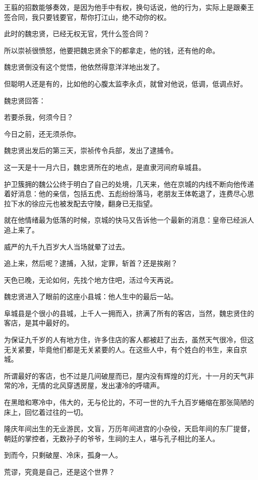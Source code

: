 \begin{multicols}{\theparacolNo}
		王翦的招数能够奏效，是因为他手中有权，换句话说，他的行为，实际上是跟秦王签合同，我只要钱要官，帮你打江山，绝不动你的权。

		此时的魏忠贤，已经无权无官，凭什么签合同？

		所以崇祯很愤怒，他要把魏忠贤余下的都拿走，他的钱，还有他的命。

		魏忠贤倒没有这个觉悟，他依然得意洋洋地出发了。

		但聪明人还是有的，比如他的心腹太监李永贞，就曾对他说，低调，低调点好。

		魏忠贤回答：

		若要杀我，何须今日？

		今日之前，还无须杀你。

		魏忠贤出发后的第三天，崇祯传令兵部，发出了逮捕令。

		这一天是十一月六日，魏忠贤所在的地点，是直隶河间府阜城县。

		护卫簇拥的魏公公终于明白了自己的处境，几天来，他在京城的内线不断向他传递着好消息：他的亲信，包括五虎、五彪纷纷落马，老朋友王体乾退了，连费尽心思拉下水的徐应元也被发配去守陵，翻身已无指望。

		就在他情绪最为低落的时候，京城的快马又告诉他一个最新的消息：皇帝已经派人追上来了。

		威严的九千九百岁大人当场就晕了过去。

		追上来，然后呢？逮捕，入狱，定罪，斩首？还是挨剐？

		天色已晚，无论如何，先找个地方住吧，活过今天再说。

		魏忠贤进入了眼前的这座小县城：他人生中的最后一站。

		阜城县是个很小的县城，上千人一拥而入，挤满了所有的客店，当然，魏忠贤住的客店，是其中最好的。

		为保证九千岁的人有地方住，许多住店的客人都被赶了出去，虽然天气很冷，但这无关紧要，毕竟他们都是无关紧要的人。在这些人中，有个姓白的书生，来自京城。

		所谓最好的客店，也不过是几间破屋而已，屋内没有辉煌的灯光，十一月的天气非常的冷，无情的北风穿透房屋，发出凄冷的呼啸声。

		在黑暗和寒冷中，伟大的，无与伦比的，不可一世的九千九百岁蜷缩在那张简陋的床上，回忆着过往的一切。

		隆庆年间出生的无业游民，文盲，万历年间进宫的小杂役，天启年间的东厂提督，朝廷的掌控者，无数孙子的爷爷，生祠的主人，堪与孔子相比的圣人。

		到而今，只剩破屋、冷床，孤身一人。

		荒谬，究竟是自己，还是这个世界？


\end{multicols}
